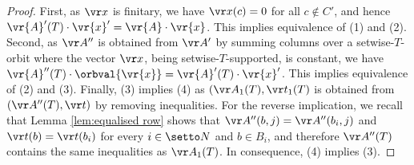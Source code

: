 \begin{proof}
First, as $\vr x$ is finitary,
we have $\vr x(c)=0$ for all $c\notin C'$, and hence 
$\vr{A}'(T) \cdot \vr{x}' = \vr{A} \cdot \vr{x}$.  
This implies equivalence of (1) and (2).
Second, as $\vr A''$ is obtained from $\vr A'$ by summing columns over a setwise-$T$-orbit 
where the vector $\vr x$, being setwise-$T$-supported, is constant,
we have $\vr{A}''(T) \cdot \orbval{\vr{x}} = \vr{A}'(T) \cdot \vr{x}'$.
This implies equivalence of (2) and (3).
Finally, (3) implies (4) as $(\vr A_1(T), \vr t_1(T)$ is obtained from $(\vr A''(T), \vr t)$ by removing 
inequalities.
For the reverse implication, we recall that Lemma \ref{lem:equalised row} shows that
$\vr A''(b, j) = \vr A''(b_i, j)$ and $\vr t(b) = \vr t(b_i)$ for every $i\in\setto N$ and $b\in B_i$, 
and therefore $\vr A''(T)$ contains the same inequalities as $\vr A_1(T)$.
In consequence, (4) implies (3).
%
%
%

\end{proof}
